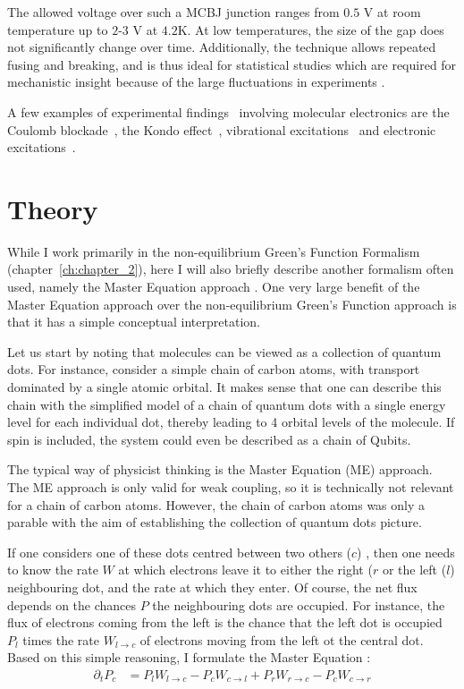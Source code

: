 The allowed voltage over such a MCBJ junction ranges from $0.5$ V at room temperature up to $2$-$3$ V at $4.2$K. At low temperatures, the size of the gap does not significantly change over time. Additionally, the technique allows repeated fusing and breaking, and is thus ideal for statistical studies which are required for mechanistic insight because of the large fluctuations in experiments \cite{ratnerrev2013}.

A few examples of experimental findings~\cite{koole} involving molecular electronics are the Coulomb blockade~\cite{Park2000, Park2002}, the Kondo effect~\cite{Park2002}, vibrational excitations~\cite{vib1, vib2} and electronic excitations~\cite{elec1}.

\section{Theory}
\label{sec:theoryintro}
While I work primarily in the non-equilibrium Green's Function Formalism (chapter~\ref{ch:chapter_2}), here I will also briefly describe another formalism often used, namely the Master Equation approach \cite{seldenthuis}. One very large benefit of the Master Equation approach over the non-equilibrium Green's Function approach is that it has a simple conceptual interpretation.

Let us start by noting that molecules can be viewed as a collection of quantum dots. For instance, consider a simple chain of carbon atoms, with transport dominated by a single atomic orbital. It makes sense that one can describe this chain with the simplified model of a chain of quantum dots with a single energy level for each individual dot, thereby leading to 4 orbital levels of the molecule. If spin is included, the system could even be described as a chain of Qubits.

The typical way of physicist thinking is the Master Equation (ME) approach. The ME approach is only valid for weak coupling, so it is technically not relevant for a chain of carbon atoms. However, the chain of carbon atoms was only a parable with the aim of establishing the collection of quantum dots picture.

If one considers one of these dots centred between two others ($c$) , then one needs to know the rate $W$ at which electrons leave it to either the right ($r$ or the left ($l$) neighbouring dot, and the rate at which they enter. Of course, the net flux depends on the chances $P$ the neighbouring dots are occupied. For instance, the flux of electrons coming from the left is the chance that the left dot is occupied $P_l$ times the rate $W_{l\rightarrow c}$ of electrons moving from the left ot the central dot. Based on this simple reasoning, I formulate the Master Equation \cite{beenakker}:
\begin{align*}
\partial_t P_c &= P_l W_{l\rightarrow c} - P_c W_{c\rightarrow l} + P_r  W_{r\rightarrow c} - P_c W_{c\rightarrow r}
\end{align*}

